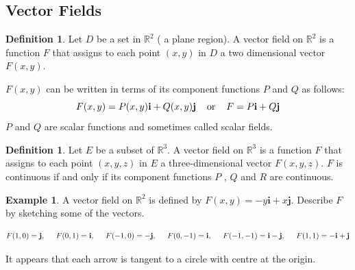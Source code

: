 \documentclass[11pt,a4paper]{article}
\theoremstyle{definition}
\newtheorem{defn}[thm]{Definition}
\newtheorem{exa}[thm]{Example}
\begin{document}
{\color[wave]{485}\subsection{Vector Fields}}

\begin{defn}
Let $D$ be a set in $\mathbb{R}^2$ ( a plane region). A vector field on $\mathbb{R}^2$ is a function $F$ that assigns to each point $(x,y)$ in $D$ a two dimensional vector $F(x,y)$.


$F(x,y)$ can be written in terms of its component functions $P$ and $Q$ as follows: $$F(x,y) = P(x,y)\textbf{i} + Q(x,y)\textbf{j}\hspace{0.4cm} \text{or}\hspace{0.4cm} F = P\textbf{i} + Q\textbf{j}$$
$P$ and $Q$ are scalar functions and sometimes called scalar fields.
\end{defn}


\begin{defn}
Let $E$ be a subset of $\mathbb{R}^3$. A vector field on $\mathbb{R}^3$ is a function $F$ that assigns to each point $(x,y,z)$ in $E$ a three-dimensional vector $F(x,y,z)$. $F$ is continuous if and only if its component functions $P$ , $Q$ and $R$ are continuous.
\end{defn}


\begin{exa}
A vector field on $\mathbb{R}^2$ is defined by $F(x,y) = -y\textbf{i} + x\textbf{j}$. Describe $F$ by sketching some of the vectors.

$$F(1,0) = \textbf{j},\hspace{0.5cm} F(0,1) = \textbf{i},\hspace{0.5cm} F(-1,0) = -\textbf{j},\hspace{0.5cm} F(0,-1) = \textbf{i}, \hspace{0.5cm} F(-1,-1) = \textbf{i}-\textbf{j},\hspace{0.5cm} F(1,1) = -\textbf{i} + \textbf{j}$$


\begin{figure}[H]
\centering
{}
\end{figure}

It appears that each arrow is tangent to a circle with centre at the origin.
\end{exa}
\end{document}
